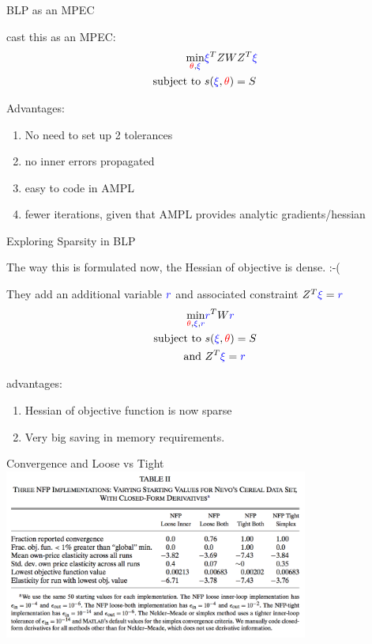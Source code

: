 \documentclass[english]{beamer}
\begin{document}
\begin{frame}{BLP as an MPEC}
\begin{midi}
\item \cite{dube2012improving} cast this as an MPEC:
\begin{align*}
\min_{{\color{red}{\theta}},{\color{blue}{\xi}}} & {\color{blue}{\xi}}^T ZWZ^T{\color{blue}{\xi}} \\
\text{subject to } & s({\color{blue}{\xi}},{\color{red}{\theta}}) = S
\end{align*}
\item Advantages:
\begin{enumerate}
\item No need to set up 2 tolerances
\item no inner errors propagated
\item easy to code in AMPL
\item fewer iterations, given that AMPL provides analytic gradients/hessian
\end{enumerate}
\end{midi}
\end{frame}

\begin{frame}{Exploring Sparsity in BLP}
\begin{midi}
\item The way this is formulated now, the Hessian of objective is dense. :-(
\item They add an additional variable ${\color{blue}{r}}$ and associated constraint $Z^T {\color{blue}{\xi}}={\color{blue}{r}}$
\begin{align*}
\min_{{\color{red}{\theta}},{\color{blue}{\xi}},{\color{blue}{r}}} & {\color{blue}{r}}^T W {\color{blue}{r}} \\
\text{subject to } & s({\color{blue}{\xi}},{\color{red}{\theta}}) = S \\
\text{ and       } & Z^T {\color{blue}{\xi}}={\color{blue}{r}}
\end{align*}
\item advantages: 
\begin{enumerate}
\item Hessian of objective function is now sparse
\item Very big saving in memory requirements.
\end{enumerate}
\end{midi}
\end{frame}

\begin{frame}{Convergence and Loose vs Tight}
\includegraphics[width=10cm]{dube-2.png}

\end{frame}
\end{document}
